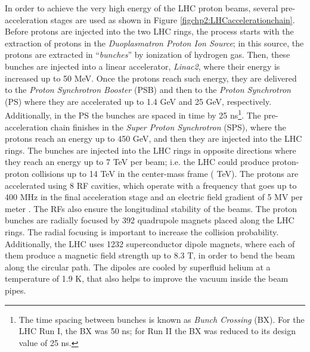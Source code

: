 In order to achieve the very high energy of the LHC proton beams, several
pre-acceleration stages are used as shown in Figure \ref{figchp2:LHCaccelerationchain}. Before 
protons are injected into the two LHC rings, the process starts 
with the extraction of protons in the \textit{Duoplasmatron 
Proton Ion Source}; in this source, the protons are extracted in ``\textit{bunches}'' 
by ionization of hydrogen gas. Then, these bunches are 
injected into a linear accelerator, \textit{Linac2}, where 
their energy is increased up to 50 MeV. Once the protons 
reach such energy, they are delivered to the 
\textit{Proton Synchrotron Booster} (PSB) and then to the \textit{Proton Synchrotron} (PS) 
where they are accelerated up to 1.4 GeV and 25 GeV, respectively. Additionally,
in the PS the bunches are spaced in time by 25 ns\footnote[1]{The time spacing between 
bunches is known as \textit{Bunch Crossing} (BX). For the LHC Run I, the BX was 50 ns; for Run II 
the BX was reduced to its design value of 25 ns.}. The pre-acceleration chain 
finishes in the \textit{Super Proton Synchrotron} (SPS), where the protons reach 
an energy up to 450 GeV, and then they are injected into the LHC rings. The bunches are 
injected into the LHC rings in opposite directions where they reach an 
energy up to 7 TeV per beam; i.e. the LHC could produce proton-proton collisions 
up to 14 TeV in the center-mass frame ( TeV). The protons are accelerated 
using 8 RF cavities, which operate with a frequency 
that goes up to 400 MHz in the final acceleration stage and an electric field 
gradient of 5 MV per meter \cite{chp2:LHCTDR}. The RFs also ensure the longitudinal stability of the beams. The 
proton bunches are radially focused by 392 quadrupole magnets placed along the 
LHC rings. The radial focusing is important to increase the collision probability. Additionally, the 
LHC uses 1232 superconductor dipole magnets, where each of them produce a magnetic field strength 
up to 8.3 T, in order to bend the beam along the circular path. The dipoles 
are cooled by superfluid helium at a temperature of 1.9 K, that also helps to improve the vacuum
inside the beam pipes. 

